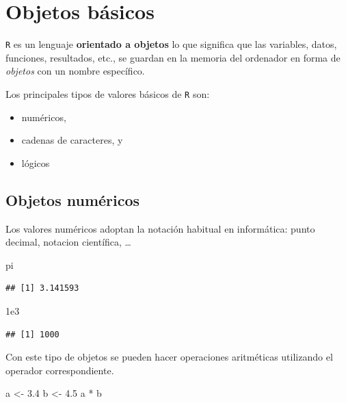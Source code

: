\documentclass[
]{book}
\newenvironment{Shaded}{\begin{snugshade}}{\end{snugshade}}
\newcommand{\FloatTok}[1]{\textcolor[rgb]{0.00,0.00,0.81}{#1}}
\newcommand{\NormalTok}[1]{#1}
\newcommand{\OtherTok}[1]{\textcolor[rgb]{0.56,0.35,0.01}{#1}}
\newcommand{\SpecialCharTok}[1]{\textcolor[rgb]{0.00,0.00,0.00}{#1}}
\theoremstyle{break}
\theoremstyle{nonumberplain}
\begin{document}
\hypertarget{objetos-buxe1sicos}{%
\section{Objetos básicos}\label{objetos-buxe1sicos}}

\texttt{R} es un lenguaje \textbf{orientado a objetos} lo que significa que las variables, datos, funciones, resultados, etc., se guardan en la memoria del ordenador en forma de \emph{objetos} con un nombre específico.

Los principales tipos de valores básicos de \texttt{R} son:

\begin{itemize}
\item
  numéricos,
\item
  cadenas de caracteres, y
\item
  lógicos
\end{itemize}

\hypertarget{objetos-numuxe9ricos}{%
\subsection{Objetos numéricos}\label{objetos-numuxe9ricos}}

Los valores numéricos adoptan
la notación habitual en informática: punto decimal, notacion científica, \ldots{}

\begin{Shaded}
\begin{Highlighting}[]
\NormalTok{pi}
\end{Highlighting}
\end{Shaded}

\begin{verbatim}
## [1] 3.141593
\end{verbatim}

\begin{Shaded}
\begin{Highlighting}[]
\FloatTok{1e3}
\end{Highlighting}
\end{Shaded}

\begin{verbatim}
## [1] 1000
\end{verbatim}

Con este tipo de objetos se pueden hacer operaciones aritméticas
utilizando el operador correspondiente.

\begin{Shaded}
\begin{Highlighting}[]
\NormalTok{a }\OtherTok{\textless{}{-}} \FloatTok{3.4}
\NormalTok{b }\OtherTok{\textless{}{-}} \FloatTok{4.5}
\NormalTok{a }\SpecialCharTok{*}\NormalTok{ b}
\end{Highlighting}
\end{Shaded}
\end{document}

